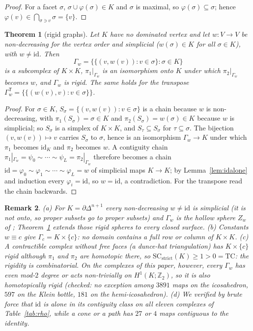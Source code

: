\documentclass[12pt]{article}
\newcommand{\TC}{\mathrm{TC}}
\newcommand{\SC}{\mathrm{SC}}
\newcommand{\SCst}{\SC_{\mathrm{strict}}}
\newcommand{\Zt}{\mathbb{Z}_2}
\newtheorem{theo}{Theorem}[section]
\newtheorem{remark}[theo]{Remark}
\begin{document}
\begin{proof}
For a facet $\sigma$, $\sigma\cup\varphi(\sigma)\in K$ and $\sigma$ is
maximal, so $\varphi(\sigma)\subseteq\sigma$; hence
$\varphi(v)\in\bigcap_{\sigma\ni v}\sigma=\{v\}$.
\end{proof}

\begin{theo}[rigid graphs]\label{thm:graphs}
Let $K$ have no dominated vertex and let $w:V\to V$ be non-decreasing for
the vertex order and simplicial ($w(\sigma)\in K$ for all $\sigma\in K$),
with $w\ne\mathrm{id}$.  Then
\[
\Gamma_w=\bigl\{\{(v,w(v)):v\in\sigma\}:\sigma\in K\bigr\}
\]
is a subcomplex of $K\times K$, $\pi_1|_{\Gamma_w}$ is an isomorphism onto
$K$ under which $\pi_2|_{\Gamma_w}$ becomes $w$, and $\Gamma_w$ is rigid.
The same holds for the transpose $\Gamma_w^{\mathsf T}=\{\{(w(v),v):v\in\sigma\}\}$.
\end{theo}

\begin{proof}
For $\sigma\in K$, $S_\sigma=\{(v,w(v)):v\in\sigma\}$ is a chain because $w$
is non-decreasing, with $\pi_1(S_\sigma)=\sigma\in K$ and
$\pi_2(S_\sigma)=w(\sigma)\in K$ because $w$ is simplicial; so $S_\sigma$ is a
simplex of $K\times K$, and $S_\tau\subseteq S_\sigma$ for $\tau\subseteq\sigma$.
The bijection $(v,w(v))\mapsto v$ carries $S_\sigma$ to $\sigma$, hence is an
isomorphism $\Gamma_w\to K$ under which $\pi_1$ becomes $\mathrm{id}_K$ and
$\pi_2$ becomes $w$.  A contiguity chain
$\pi_1|_{\Gamma_w}=\psi_0\sim\cdots\sim\psi_L=\pi_2|_{\Gamma_w}$ therefore
becomes a chain $\mathrm{id}=\varphi_0\sim\varphi_1\sim\cdots\sim\varphi_L=w$
of simplicial maps $K\to K$; by Lemma~\ref{lem:idalone} and induction every
$\varphi_i=\mathrm{id}$, so $w=\mathrm{id}$, a contradiction.  For the
transpose read the chain backwards.
\end{proof}

\begin{remark}\label{rem:graphs}
(a) For $K=\partial\Delta^{n+1}$ every non-decreasing $w\ne\mathrm{id}$ is
simplicial (it is not onto, so proper subsets go to proper subsets) and
$\Gamma_w$ is the hollow sphere $Z_w$ of \cite{PM26b}; Theorem~\ref{thm:graphs}
extends those rigid spheres to every closed surface.  (b) Constants $w\equiv c$
give $\Gamma_c=K\times\{c\}$: no domain contains a full row or column of
$K\times K$.  (c) A contractible complex without free faces (a dunce-hat
triangulation) has $K\times\{c\}$ rigid although $\pi_1$ and $\pi_2$ are
homotopic there, so $\SCst(K)\ge1>0=\TC$: the rigidity is combinatorial.  On
the complexes of this paper, however, every $\Gamma_w$ has even mod-$2$
degree or acts non-trivially on $H^1(K;\Zt)$, so it is also homotopically
rigid (checked: no exception among $3891$ maps on the icosahedron, $597$ on
the Klein bottle, $181$ on the hemi-icosahedron).  (d) We verified by brute
force that $\mathrm{id}$ is alone in its contiguity class on all eleven
complexes of Table~\ref{tab:rho}, while a cone or a path has $27$ or $4$
maps contiguous to the identity.
\end{remark}
\end{document}
